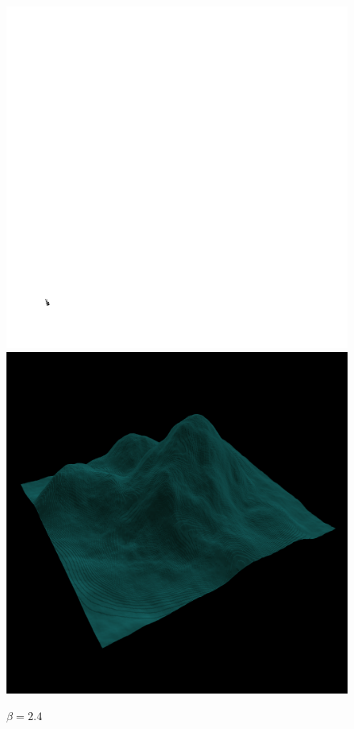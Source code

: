 		\begin{figure}[H]
		  \centering
		  \includegraphics[width=\imagewidth]{images/results/terrains/512-1/fourier/24}
		  \includegraphics[width=\imagewidth]{images/results/terrains/512-1/fourier/24_3d}
		  \caption{$\beta = 2.4$}
		  \label{fig:ex-fourier24-surface}
		\end{figure}
		
